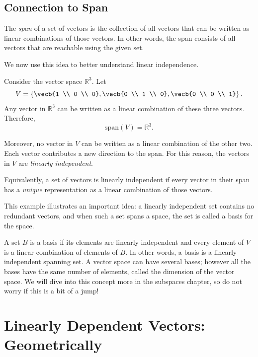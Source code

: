\subsection{Connection to Span}

The \emph{span} of a set of vectors is the collection of all vectors that can be written as linear combinations of those vectors. In other words, the span consists of all vectors that are reachable using the given set.

We now use this idea to better understand linear independence.

Consider the vector space $\mathbb{R}^3$. Let
\[
V = \left\{
\vecb{1 \\ 0 \\ 0},
\vecb{0 \\ 1 \\ 0},
\vecb{0 \\ 0 \\ 1}
\right\}.
\]
Any vector in $\mathbb{R}^3$ can be written as a linear combination of these three vectors. Therefore,
\[
\mathrm{span}(V) = \mathbb{R}^3.
\]

Moreover, no vector in $V$ can be written as a linear combination of the other two. Each vector contributes a new direction to the span. For this reason, the vectors in $V$ are \emph{linearly independent}.

Equivalently, a set of vectors is linearly independent if every vector in their span
has a \emph{unique} representation as a linear combination of those vectors.

This example illustrates an important idea: a linearly independent set contains no redundant vectors, and when such a set spans a space, the set is called a basis for the space. 

A set $B$ is a basis if its elements are linearly independent and every element of $V$ is a linear combination of elements of $B$. In other words, a basis is a linearly independent spanning set. A vector space can have several bases; however all the bases have the same number of elements, called the dimension of the vector space. We will dive into this concept more in the subspaces chapter, so do not worry if this is a bit of a jump! %


\section{Linearly Dependent Vectors: Geometrically}

